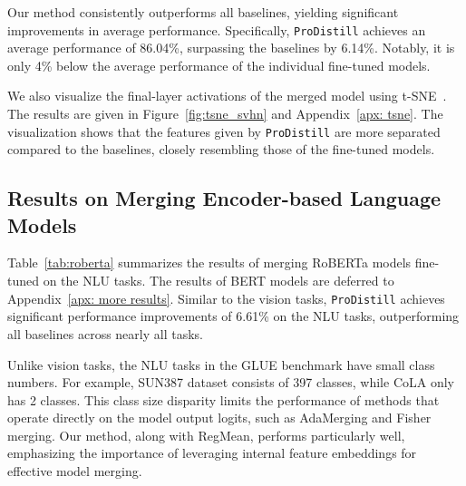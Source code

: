 Our method consistently outperforms all baselines, yielding significant improvements in average performance.
Specifically, \texttt{ProDistill} achieves an average performance of 86.04\%, surpassing the baselines by 6.14\%. Notably, it is only 4\% below the average performance of the individual fine-tuned models.

We also visualize the final-layer activations of the merged model using t-SNE~\citep{van2008visualizing}. The results are given in Figure~\ref{fig:tsne_svhn} and Appendix~\ref{apx: tsne}. The visualization shows that the features given by \texttt{ProDistill} are more separated compared to the baselines, closely resembling those of the fine-tuned models.




\subsection{Results on Merging Encoder-based Language Models}
Table~\ref{tab:roberta} summarizes the results of merging RoBERTa models fine-tuned on the NLU tasks.
The results of BERT models are deferred to Appendix~\ref{apx: more results}.
Similar to the vision tasks, \texttt{ProDistill} achieves significant performance improvements of 6.61\% on the NLU tasks, outperforming all baselines across nearly all tasks. 

Unlike vision tasks, the NLU tasks in the GLUE benchmark have small class numbers. For example, SUN387 dataset consists of 397 classes, while CoLA only has 2 classes.  This class size disparity limits the performance of methods that operate directly on the model output logits, such as AdaMerging and Fisher merging.
Our method, along with RegMean, performs particularly well, emphasizing the importance of leveraging internal feature embeddings for effective model merging.

